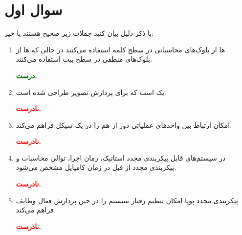 \section{سوال اول}


با ذکر دلیل بیان کنید جملات زیر صحیح هستند یا خیر:


\begin{enumerate}
	\item {}ها از بلوک‌های محاسباتی در سطح کلمه استفاده می‌کنند در حالی که ها از بلوک‌های منطقی در سطح بیت استفاده می‌کنند.
	\begin{qsolve}
		\textbf{\textcolor{darkgreen}{درست.}}\\
		
	\end{qsolve}
	
	
	
	\item {}
	 یک  است که برای پردازش تصویر طراحی شده است.
	\begin{qsolve}
		\textbf{\textcolor{red}{نادرست.}}\\
		
	\end{qsolve}
	
	
	
	
	\item
	 امکان ارتباط بین واحدهای عملیاتی دور از هم را در یک سیکل فراهم می‌کند.
	\begin{qsolve}
		\textbf{\textcolor{red}{نادرست.}}\\
		
	\end{qsolve}
	
	
	
	\item در سیستم‌های قابل پیکربندی مجدد استاتیک، زمان اجرا، توالی محاسبات و پیکربندی مجدد از قبل در زمان کامپایل مشخص می‌شود.
	\begin{qsolve}
		\textbf{\textcolor{red}{نادرست.}}\\
		
	\end{qsolve}
	
	
	
	\item پیکربندی مجدد پویا امکان تنظیم رفتار سیستم را در حین پردازش فعال وظایف فراهم می‌کند.
	\begin{qsolve}
		\textbf{\textcolor{red}{نادرست.}}\\
		
	\end{qsolve}
	
	
\end{enumerate}
